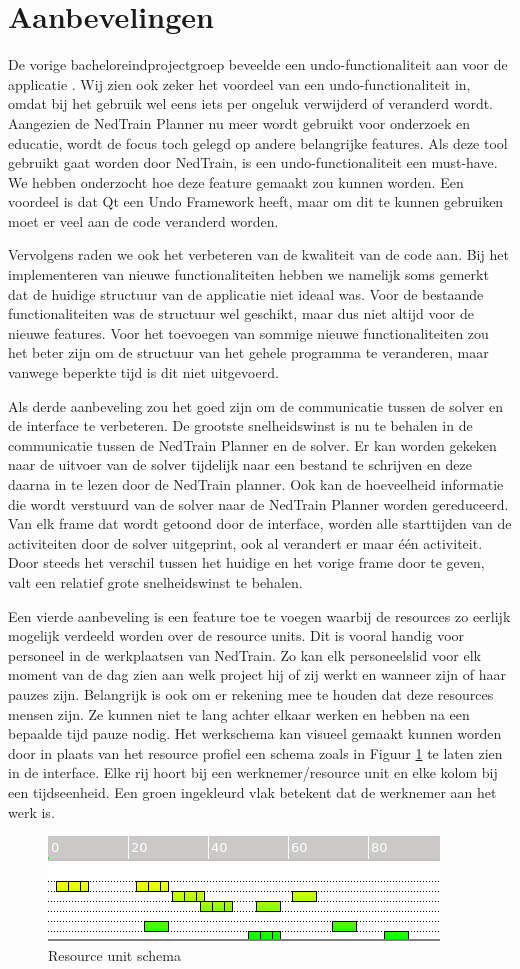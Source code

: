 \section{Aanbevelingen}
De vorige bacheloreindprojectgroep beveelde een undo-functionaliteit aan voor de applicatie \cite{bep2012nedtrain}. Wij zien ook zeker het voordeel van een undo-functionaliteit in, omdat bij het gebruik wel eens iets per ongeluk verwijderd of veranderd wordt. Aangezien de NedTrain Planner nu meer wordt gebruikt voor onderzoek en educatie, wordt de focus toch gelegd op andere belangrijke features. Als deze tool gebruikt gaat worden door NedTrain, is een undo-functionaliteit een must-have. We hebben onderzocht hoe deze feature gemaakt zou kunnen worden. Een voordeel is dat Qt een Undo Framework heeft, maar om dit te kunnen gebruiken moet er veel aan de code veranderd worden. 

Vervolgens raden we ook het verbeteren van de kwaliteit van de code aan. Bij het implementeren van nieuwe functionaliteiten hebben we namelijk soms gemerkt dat de huidige structuur van de applicatie niet ideaal was. Voor de bestaande functionaliteiten was de structuur wel geschikt, maar dus niet altijd voor de nieuwe features. Voor het toevoegen van sommige nieuwe functionaliteiten zou het beter zijn om de structuur van het gehele programma te veranderen, maar vanwege beperkte tijd is dit niet uitgevoerd.

Als derde aanbeveling zou het goed zijn om de communicatie tussen de solver en de interface te verbeteren. De grootste snelheidswinst is nu te behalen in de communicatie tussen de NedTrain Planner en de solver. Er kan worden gekeken naar de uitvoer van de solver tijdelijk naar een bestand te schrijven en deze daarna in te lezen door de NedTrain planner. Ook kan de hoeveelheid informatie die wordt verstuurd van de solver naar de NedTrain Planner worden gereduceerd. Van elk frame dat wordt getoond door de interface, worden alle starttijden van de activiteiten door de solver uitgeprint, ook al verandert er maar \'e\'en activiteit. Door steeds het verschil tussen het huidige en het vorige frame door te geven, valt een relatief grote snelheidswinst te behalen.

Een vierde aanbeveling is een feature toe te voegen waarbij de resources zo eerlijk mogelijk verdeeld worden over de resource units. Dit is vooral handig voor personeel in de werkplaatsen van NedTrain. Zo kan elk personeelslid voor elk moment van de dag zien aan welk project hij of zij werkt en wanneer zijn of haar pauzes zijn. Belangrijk is ook om er rekening mee te houden dat deze resources mensen zijn. Ze kunnen niet te lang achter elkaar werken en hebben na een bepaalde tijd pauze nodig. Het werkschema kan visueel gemaakt kunnen worden door in plaats van het resource profiel een schema zoals in Figuur \ref{fig:schema} te laten zien in de interface. Elke rij hoort bij een werknemer/resource unit en elke kolom bij een tijdseenheid. Een groen ingekleurd vlak betekent dat de werknemer aan het werk is.

\begin{figure}[H]
\centering
\includegraphics[width=.5\textwidth]{../images/schedule.png}
\caption{Resource unit schema}
\label{fig:schema}
\end{figure}
